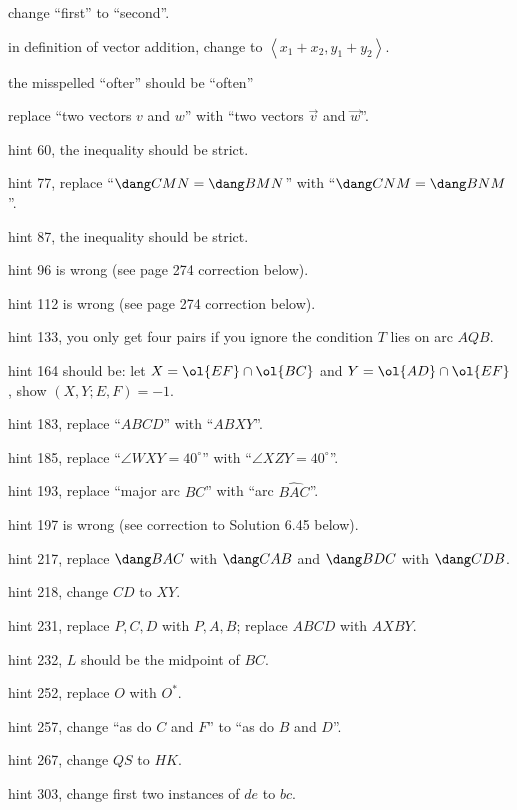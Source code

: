 \documentclass[11pt]{scrartcl}
\begin{document}
\begin{description}
  change ``first'' to ``second''.
\item[p.\  218] in definition of vector addition,
  change to $\left\langle x_1+x_2, y_1+y_2 \right\rangle$.
\item[p.\  218] the misspelled ``ofter'' should be ``often''
\item[p.\  219] replace ``two vectors $v$ and $w$'' with ``two vectors $\vec v$ and $\vec w$''.
\item[p.\  222] hint 60, the inequality should be strict.
\item[p.\  223] hint 77, replace ``$\dang CMN = \dang BMN$''
  with ``$\dang CNM = \dang BNM$''.
\item[p.\  223] hint 87, the inequality should be strict.
\item[p.\  223] hint 96 is wrong (see page 274 correction below).
\item[p.\  224] hint 112 is wrong (see page 274 correction below).
\item[p.\  224] hint 133, you only get four pairs if you ignore the condition $T$ lies on arc $AQB$.
\item[p.\  225] hint 164 should be: let $X = \ol{EF} \cap \ol{BC}$ and $Y = \ol{AD} \cap \ol{EF}$, show $(X,Y;E,F) = -1$.
\item[p.\  226] hint 183, replace ``$ABCD$'' with ``$ABXY$''.
\item[p.\  226] hint 185, replace ``$\angle WXY = 40^{\circ}$''
  with ``$\angle XZY = 40^{\circ}$''.
\item[p.\  226] hint 193, replace ``major arc $BC$'' with ``arc $\widehat{BAC}$''.
\item[p.\  226] hint 197 is wrong (see correction to Solution 6.45 below).
\item[p.\  226] hint 217, replace $\dang BAC$ with $\dang CAB$ and $\dang BDC$ with $\dang CDB$.
\item[p.\  226] hint 218, change $CD$ to $XY$.
\item[p.\  227] hint 231, replace $P,C,D$ with $P,A,B$; replace $ABCD$ with $AXBY$.
\item[p.\  227] hint 232, $L$ should be the midpoint of $BC$.
\item[p.\  227] hint 252, replace $O$ with $O^\ast$.
\item[p.\  228] hint 257, change ``as do $C$ and $F$'' to ``as do $B$ and $D$''.
\item[p.\  228] hint 267, change $QS$ to $HK$.
\item[p.\  229] hint 303, change first two instances of $de$ to $bc$.

\end{description}
\end{document}
